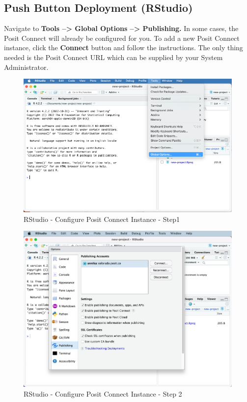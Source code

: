 \documentclass[
  letterpaper,
  DIV=11,
  numbers=noendperiod]{scrreprt}
\begin{document}
\subsection{Push Button Deployment
(RStudio)}\label{push-button-deployment-rstudio}

Navigate to \textbf{Tools --\textgreater{} Global Options
--\textgreater{} Publishing.} In some cases, the Posit Connect will
already be configured for you. To add a new Posit Connect instance,
click the \textbf{Connect} button and follow the instructions. The only
thing needed is the Posit Connect URL which can be supplied by your
System Administrator.

\begin{figure}

{\centering \includegraphics[width=9.79167in,height=\textheight]{images/rstudio-connect1.png}

}

\caption{RStudio - Configure Posit Connect Instance - Step1}

\end{figure}%
\begin{figure}

{\centering \includegraphics[width=6.15625in,height=\textheight]{images/rstudio-connect2.png}

}

\caption{RStudio - Configure Posit Connect Instance - Step 2}

\end{figure}%
\end{document}
